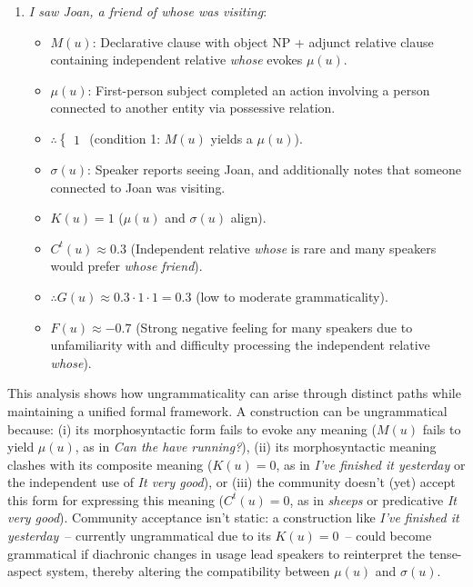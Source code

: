 \documentclass[12pt,letterpaper]{article}
\begin{document}
\begin{enumerate}
    \item \textit{I saw Joan, a friend of whose was visiting}:
    \begin{itemize}
        \item \(M(u)\): Declarative clause with object NP + adjunct relative clause containing independent relative \textit{whose} evokes \(\mu(u)\).
        \item \(\mu(u)\): First-person subject completed an action involving a person connected to another entity via possessive relation.
        \item \(\therefore \begin{cases} 1 \end{cases}\) (condition 1: \(M(u)\) yields a \(\mu(u)\)).
        \item \(\sigma(u)\): Speaker reports seeing Joan, and additionally notes that someone connected to Joan was visiting.
        \item \(K(u) = 1\) (\(\mu(u)\) and \(\sigma(u)\) align).
        \item \(C^t(u) \approx 0.3\) (Independent relative \textit{whose} is rare and many speakers would prefer \textit{whose friend}).
        \item \(\therefore G(u) \approx 0.3 \cdot 1 \cdot 1 = 0.3\) (low to moderate grammaticality).
        \item \(F(u) \approx -0.7\) (Strong negative feeling for many speakers due to unfamiliarity with and difficulty processing the independent relative \textit{whose}).
    \end{itemize}
\end{enumerate}

This analysis shows how ungrammaticality can arise through distinct paths while maintaining a unified formal framework. A construction can be ungrammatical because: (i) its morphosyntactic form fails to evoke any meaning (\(M(u)\) fails to yield \(\mu(u)\), as in \textit{Can the have running?}), (ii) its morphosyntactic meaning clashes with its composite meaning (\(K(u) = 0\), as in \textit{I've finished it yesterday} or the independent use of \textit{It very good}), or (iii) the community doesn't (yet) accept this form for expressing this meaning (\(C^t(u) = 0\), as in \textit{sheeps} or predicative \textit{It very good}).  Community acceptance isn't static: a construction like \textit{I've finished it yesterday}~-- currently ungrammatical due to its \(K(u) = 0\)~-- could become grammatical if diachronic changes in usage lead speakers to reinterpret the tense-aspect system, thereby altering the compatibility between \(\mu(u)\) and \(\sigma(u)\).
\end{document}
